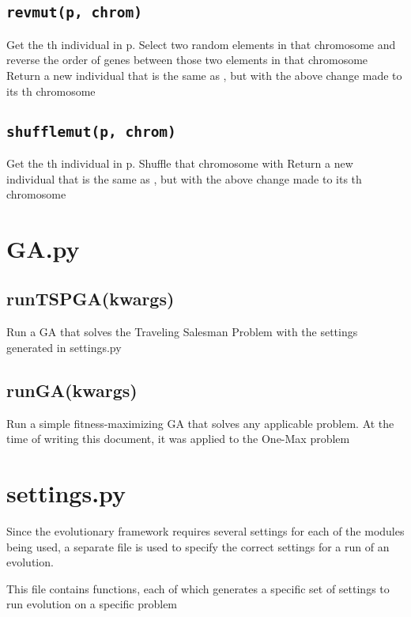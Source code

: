 \documentclass[letterpaper,10pt,english]{sphinxmanual}
\begin{document}
\section{\texttt{revmut(p, chrom)}}
\label{mutation.py:revmut-p-chrom}
Get the  th individual in p. Select two random elements in that chromosome and reverse the order of genes between those two elements in that chromosome
Return a new individual that is the same as , but with the above change made to its  th chromosome


\section{\texttt{shufflemut(p, chrom)}}
\label{mutation.py:shufflemut-p-chrom}
Get the  th individual in p. Shuffle that chromosome with 
Return a new individual that is the same as , but with the above change made to its  th chromosome


\chapter{GA.py}
\label{GA.py::doc}\label{GA.py:ga-py}

\section{runTSPGA(kwargs)}
\label{GA.py:runtspga-kwargs}
Run a GA that solves the Traveling Salesman Problem with the settings generated in settings.py


\section{runGA(kwargs)}
\label{GA.py:runga-kwargs}
Run a simple fitness-maximizing GA that solves any applicable problem. At the time of writing this document, it was applied to the One-Max problem


\chapter{settings.py}
\label{settings.py:settings-py}\label{settings.py::doc}
Since the evolutionary framework requires several settings for each of the modules being used, a separate file is used to specify the correct settings for a run of an evolution.

This file contains functions, each of which generates a specific set of settings to run evolution on a specific problem
\end{document}
